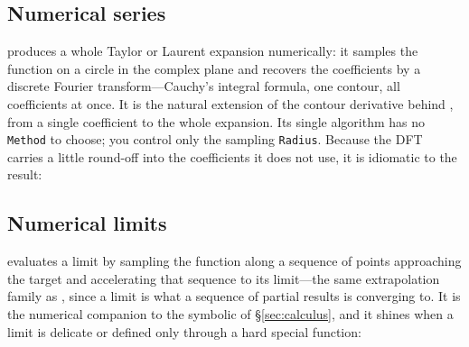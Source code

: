 

\subsection{Numerical series}
\label{ssec:nseries}

 produces a whole Taylor or Laurent expansion numerically:
it samples the function on a circle in the complex plane and recovers the coefficients by a
discrete Fourier transform---Cauchy's integral formula, one contour, all coefficients at once. It is
the natural extension of the contour derivative behind , from a single coefficient to the whole
expansion. Its single algorithm has no \texttt{Method} to choose; you control only the sampling
\texttt{Radius}. Because the DFT carries a little round-off into the coefficients it does not use, it is
idiomatic to  the result:

\begin{codepairs}
\end{codepairs}


\subsection{Numerical limits}
\label{ssec:nlimit}

 evaluates a limit by sampling the function along a
sequence of points approaching the target and accelerating that sequence to its limit---the same
extrapolation family as , since a limit is what a sequence of partial results is converging to.
It is the numerical companion to the symbolic  of \S\ref{sec:calculus}, and it shines when a
limit is delicate or defined only through a hard special function:

